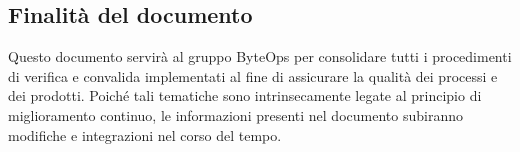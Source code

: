 \subsection{Finalità del documento}
Questo documento servirà al gruppo ByteOps per consolidare tutti i procedimenti di verifica e convalida implementati al fine di assicurare la qualità dei processi e dei prodotti. Poiché tali tematiche sono intrinsecamente legate al principio di miglioramento continuo, le informazioni presenti nel documento subiranno modifiche e integrazioni nel corso del tempo. 